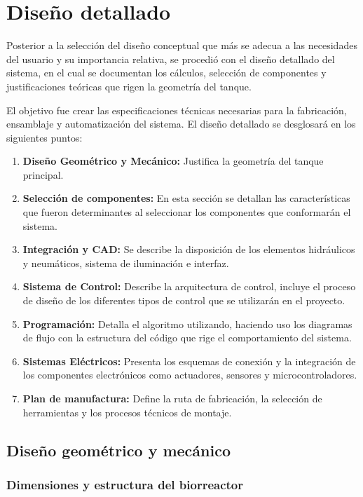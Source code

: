 \chapter{Diseño detallado}\label{cap8}

Posterior a la selección del diseño conceptual que más se adecua a las
necesidades del usuario y su importancia relativa, se procedió con el diseño
detallado del sistema, en el cual se documentan los cálculos, selección de
componentes y justificaciones teóricas que rigen la geometría del tanque.

El objetivo fue crear las especificaciones técnicas necesarias para la 
fabricación, ensamblaje y automatización del sistema. El diseño detallado se
desglosará en los siguientes puntos:

\begin{enumerate}
  \item \textbf{Diseño Geométrico y Mecánico:} Justifica la geometría del tanque principal.
  \item \textbf{Selección de componentes:} En esta sección se detallan las características que fueron determinantes al seleccionar los componentes que conformarán el sistema.
  \item \textbf{Integración y CAD:} Se describe la disposición de los elementos hidráulicos y neumáticos, sistema de iluminación e interfaz.
  \item \textbf{Sistema de Control:} Describe la arquitectura de control, incluye el proceso de diseño de los diferentes tipos de control que se utilizarán en el proyecto.
  \item \textbf{Programación:} Detalla el algoritmo utilizando, haciendo uso los diagramas de flujo con la estructura del código que rige el comportamiento del sistema.
  \item \textbf{Sistemas Eléctricos:} Presenta los esquemas de conexión y la integración de los componentes electrónicos como actuadores, sensores y microcontroladores.
  \item \textbf{Plan de manufactura:} Define la ruta de fabricación, la selección de herramientas y los procesos técnicos de montaje.
\end{enumerate}

\section{Diseño geométrico y mecánico}

\subsection{Dimensiones y estructura del biorreactor}

